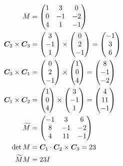 \documentclass{article}
\begin{document}
\begin{align*}
	M                      & = \begin{pmatrix}
		1 & 3 & 0 \\ 0 & -1 & -2 \\ 4 & 1 & -1
	\end{pmatrix}                                                                  \\
	\bm C_2 \times \bm C_3 & = \begin{pmatrix} 3 \\ -1 \\ 1 \end{pmatrix} \times \begin{pmatrix} 0 \\ 2 \\ -1 \end{pmatrix} = \begin{pmatrix} -1 \\ 3 \\ 6 \end{pmatrix} \\
	\bm C_3 \times \bm C_1 & = \begin{pmatrix} 0 \\ 2 \\ -1 \end{pmatrix} \times \begin{pmatrix} 1 \\ 0 \\ 4 \end{pmatrix} = \begin{pmatrix} 8 \\ -1 \\ -2 \end{pmatrix} \\
	\bm C_1 \times \bm C_2 & = \begin{pmatrix} 1 \\ 0 \\ 4 \end{pmatrix} \times \begin{pmatrix} 3 \\ -1 \\ 1 \end{pmatrix} = \begin{pmatrix} 4 \\ 11 \\ -1 \end{pmatrix} \\
	\widetilde{M}            & = \begin{pmatrix}
		-1 & 3 & 6 \\ 8 & -1 & -2 \\ 4 & 11 & -1
	\end{pmatrix}                                                                  \\
	\det M                 & = \bm C_1 \cdot \bm C_2 \times \bm C_3 = 23                                                    \\
	\widetilde{M} M          & = 23 I
\end{align*}
\end{document}
